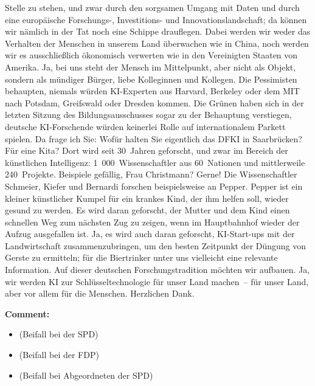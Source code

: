 \documentclass{article}
\begin{document}
Stelle zu stehen, und zwar durch den sorgsamen Umgang mit Daten und durch eine europäische Forschungs-, Investitions- und Innovationslandschaft; da können wir nämlich in der Tat noch eine Schippe drauflegen. Dabei werden wir weder das Verhalten der Menschen in unserem Land überwachen wie in China, noch werden wir es ausschließlich ökonomisch verwerten wie in den Vereinigten Staaten von Amerika. Ja, bei uns steht der Mensch im Mittelpunkt, aber nicht als Objekt, sondern als mündiger Bürger, liebe Kolleginnen und Kollegen.  Die Pessimisten behaupten, niemals würden KI-Experten aus Harvard, Berkeley oder dem MIT nach Potsdam, Greifswald oder Dresden kommen. Die Grünen haben sich in der letzten Sitzung des Bildungsausschusses sogar zu der Behauptung verstiegen, deutsche KI-Forschende würden keinerlei Rolle auf internationalem Parkett spielen. Da frage ich Sie: Wofür halten Sie eigentlich das DFKI in Saarbrücken? Für eine Kita? Dort wird seit 30 Jahren geforscht, und zwar im Bereich der künstlichen Intelligenz: 1 000 Wissenschaftler aus 60 Nationen und mittlerweile 240 Projekte.  Beispiele gefällig, Frau Christmann? Gerne! Die Wissenschaftler Schmeier, Kiefer und Bernardi forschen beispielsweise an Pepper. Pepper ist ein kleiner künstlicher Kumpel für ein krankes Kind, der ihm helfen soll, wieder gesund zu werden.  Es wird daran geforscht, der Mutter und dem Kind einen schnellen Weg zum nächsten Zug zu zeigen, wenn im Hauptbahnhof wieder der Aufzug ausgefallen ist. Ja, es wird auch daran geforscht, KI-Start-ups mit der Landwirtschaft zusammenzubringen, um den besten Zeitpunkt der Düngung von Gerste zu ermitteln; für die Biertrinker unter uns vielleicht eine relevante Information.  Auf dieser deutschen Forschungstradition möchten wir aufbauen. Ja, wir werden KI zur Schlüsseltechnologie für unser Land machen – für unser Land, aber vor allem für die Menschen. Herzlichen Dank.  

\noindent\textbf{Comment:}
\begin{itemize}
    \setlength\itemsep{-3pt}
    \item (Beifall bei der SPD)
    \setlength\itemsep{-3pt}
    \item (Beifall bei der FDP)
    \setlength\itemsep{-3pt}
    \item (Beifall bei Abgeordneten der SPD)
\end{itemize}
\end{document}
